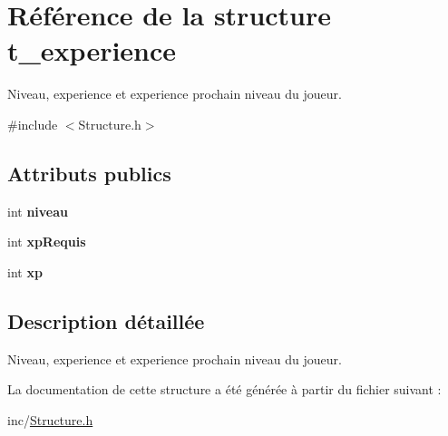 \hypertarget{structt__experience}{}\section{Référence de la structure t\+\_\+experience}
\label{structt__experience}


Niveau, experience et experience prochain niveau du joueur.  




{\ttfamily \#include $<$Structure.\+h$>$}

\subsection*{Attributs publics}
\begin{DoxyCompactItemize}
\item 
\hypertarget{structt__experience_a094dacc0ac40e2890512cd52248f6a3b}{}int {\bfseries niveau}\label{structt__experience_a094dacc0ac40e2890512cd52248f6a3b}

\item 
\hypertarget{structt__experience_ab84efc248919e1a506e2f1e6f556b033}{}int {\bfseries xp\+Requis}\label{structt__experience_ab84efc248919e1a506e2f1e6f556b033}

\item 
\hypertarget{structt__experience_a614f8b7e737ff47db852485c071e7f92}{}int {\bfseries xp}\label{structt__experience_a614f8b7e737ff47db852485c071e7f92}

\end{DoxyCompactItemize}


\subsection{Description détaillée}
Niveau, experience et experience prochain niveau du joueur. 

La documentation de cette structure a été générée à partir du fichier suivant \+:\begin{DoxyCompactItemize}
\item 
inc/\hyperlink{Structure_8h}{Structure.\+h}\end{DoxyCompactItemize}
